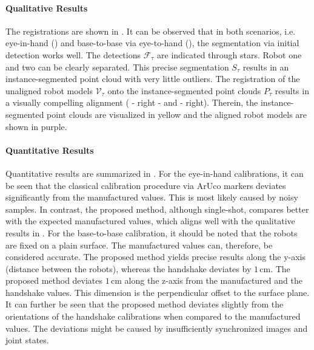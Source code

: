 \paragraph{Qualitative Results} The registrations are shown in . It can be observed that in both scenarios, i.e. eye-in-hand () and base-to-base via eye-to-hand (), the segmentation via initial detection works well. The detections $\mathcal{F}_\tau$ are indicated through stars. Robot one and two can be clearly separated. This precise segmentation $S_\tau$ results in an instance-segmented point cloud with very little outliers. The registration of the unaligned robot models $\mathcal{V}_\tau$ onto the instance-segmented point clouds $P_\tau$ results in a visually compelling alignment ( - right - and  - right). Therein, the instance-segmented point clouds are visualized in yellow and the aligned robot models are shown in purple.

\paragraph{Quantitative Results} Quantitative results are summarized in . For the eye-in-hand calibrations, it can be seen that the classical calibration procedure via ArUco markers deviates significantly from the manufactured values. This is most likely caused by noisy samples. In contrast, the proposed method, although single-shot, compares better with the expected manufactured values, which aligns well with the qualitative results in . For the base-to-base calibration, it should be noted that the robots are fixed on a plain surface. The manufactured values can, therefore, be considered accurate. The proposed method yields precise results along the y-axis (distance between the robots), whereas the handshake deviates by $1\,\text{cm}$. The proposed method deviates $1\,\text{cm}$ along the z-axis from the manufactured and the handshake values. This dimension is the perpendicular offset to the surface plane. It can further be seen that the proposed method deviates slightly from the orientations of the handshake calibrations when compared to the manufactured values. The deviations might be caused by insufficiently synchronized images and joint states.


